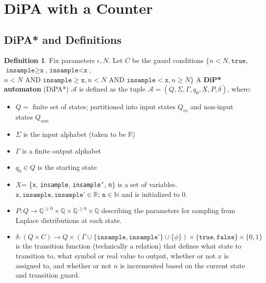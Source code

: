 \documentclass[12pt]{article}
\newcommand{\NN}{\mathbb{N}}
\newcommand{\QQ}{\mathbb{Q}}
\newcommand{\RR}{\mathbb{R}}
\newcommand{\gguard}{\texttt{insample}\geq \texttt{x}}
\newcommand{\lguard}{\texttt{insample} < \texttt{x}}
\newcommand{\gaguard}{n<N \text{ AND } \texttt{insample} \geq \texttt{x}}
\newcommand{\laguard}{n<N\text{ AND }\texttt{insample} < \texttt{x}}
\theoremstyle{definition}
\newtheorem{defn}[thm]{Definition}
\begin{document}
\section{DiPA with a Counter}
\subsection{DiPA* and Definitions}
\begin{defn} Fix parameters $\epsilon, N$. Let $C$ be the guard conditions $\{n<N,\texttt{true}$, $\gguard$,$\lguard$, $\gaguard, \laguard, n\geq N\}$ A \textbf{DiP* automaton} (DiPA*) $\mathcal{A}$ is defined as the tuple $\mathcal{A} = (Q, \Sigma, \Gamma, q_0, X, P, \delta)$, where:
\begin{itemize}
	\item $Q = $ finite set of states; partitioned into input states $Q_{in}$ and non-input states $Q_{non}$
	\item $\Sigma$ is the input alphabet (taken to be $\RR$)
	\item $\Gamma$ is a finite output alphabet
	\item $q_0\in Q$ is the starting state
	\item $X$= \{\texttt{x}, \texttt{insample}, \texttt{insample'}, \texttt{n}\} is a set of variables. $\texttt{x}, \texttt{insample}, \texttt{insample'} \in \RR$; $\texttt{n} \in \NN$ and is initialized to 0.
	\item $P: Q \to \QQ^{\geq 0} \times \QQ \times \QQ^{\geq 0} \times \QQ$ describing the parameters for sampling from Laplace distributions at each state.
	\item $\delta: (Q \times C) \to Q\times (\Gamma \cup \{\texttt{insample}, \texttt{insample'}\}\cup \{\phi\}) \times \{\texttt{true}, \texttt{false}\} \times \{0, 1\}$ is the transition function (technically a relation) that defines what state to transition to, what symbol or real value to output, whether or not $x$ is assigned to, and whether or not $n$ is incremented based on the current state and transition guard.
\end{itemize}
\end{defn}
\end{document}

